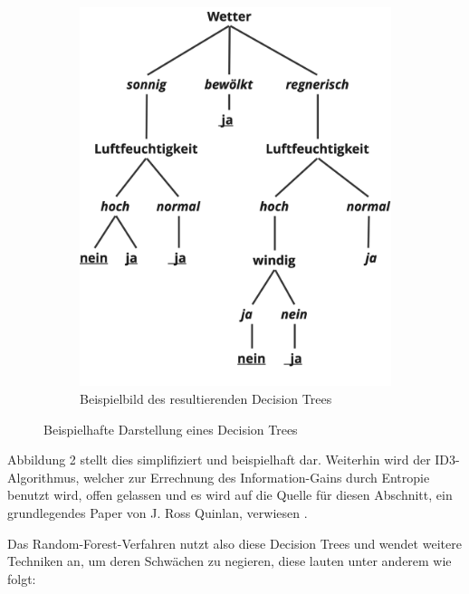 \begin{figure}[h!]
\begin{subfigure}[b]{0.45\textwidth}
        \includegraphics[width=\textwidth]{../Bilder/DT_ex.png}
        \caption{Beispielbild des resultierenden Decision Trees}
        \label{fig:example}
    \end{subfigure}
    \caption{Beispielhafte Darstellung eines Decision Trees}
\end{figure}

Abbildung 2 stellt dies simplifiziert und beispielhaft dar. Weiterhin wird der ID3-Algorithmus, welcher zur Errechnung des Information-Gains durch Entropie benutzt wird, offen gelassen und es wird auf die Quelle für diesen Abschnitt, ein grundlegendes Paper von J. Ross Quinlan, verwiesen \cite{Quinlan1986}.

Das Random-Forest-Verfahren nutzt also diese Decision Trees und wendet weitere Techniken an, um deren Schwächen zu negieren, diese lauten unter anderem wie folgt:

